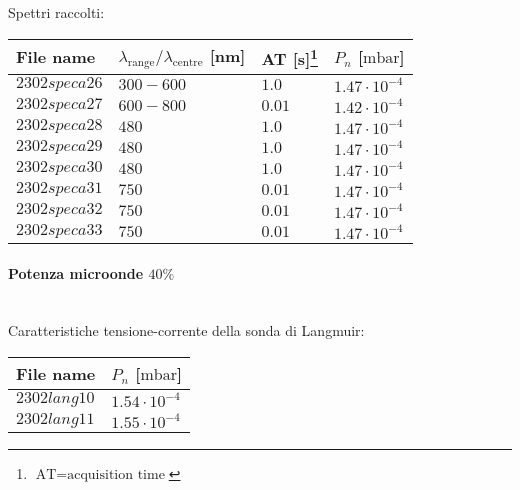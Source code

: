 Spettri raccolti:
\begin{center}
\begin{tabular}{p{3cm}p{4cm}p{2cm}p{3cm}}
\toprule
File name	&$\lambda_\text{range}\text{/}\lambda_\text{centre}$ [nm] &AT [s]\footnote{$\text{AT}=\text{acquisition time}$} &$P_{n}$ [$\si{\milli\bar}$]\\
\midrule
$2302speca26$	&$300-600$	&$1.0$		&$1.47\cdot10^{-4}$\\
$2302speca27$	&$600-800$	&$0.01$		&$1.42\cdot10^{-4}$\\
$2302speca28$	&$480$		&$1.0$		&$1.47\cdot10^{-4}$\\
$2302speca29$	&$480$		&$1.0$		&$1.47\cdot10^{-4}$\\
$2302speca30$	&$480$		&$1.0$		&$1.47\cdot10^{-4}$\\
$2302speca31$	&$750$		&$0.01$		&$1.47\cdot10^{-4}$\\
$2302speca32$	&$750$		&$0.01$		&$1.47\cdot10^{-4}$\\
$2302speca33$	&$750$		&$0.01$		&$1.47\cdot10^{-4}$\\
\bottomrule
\end{tabular}
\end{center}


\paragraph*{Potenza microonde $\text{40\%}$} ~\\
Caratteristiche tensione-corrente della sonda di Langmuir:
\begin{center}
\begin{tabular}{p{3cm}p{3cm}}
\toprule
File name	&$P_{n}$ [$\si{\milli\bar}$]\\
\midrule
$2302lang10$	&$1.54\cdot10^{-4}$\\
$2302lang11$	&$1.55\cdot10^{-4}$\\
\bottomrule
\end{tabular}
\end{center}

